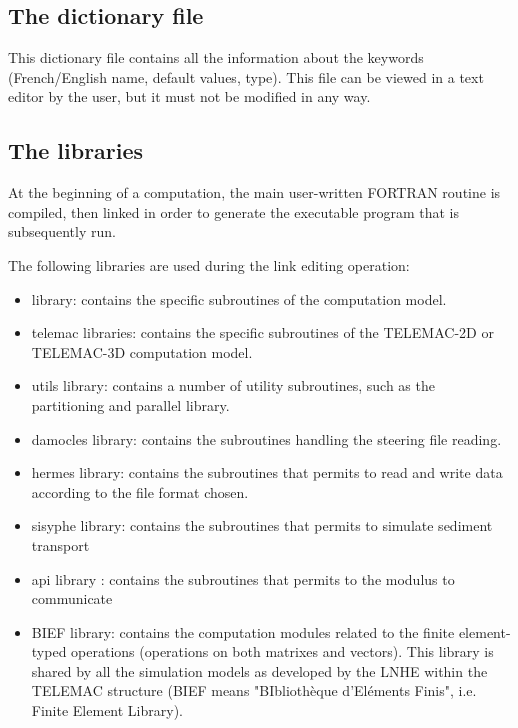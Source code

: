 \subsection{ The dictionary file}

 This dictionary file contains all the information about the keywords (French/English name, default values, type). This file can be viewed in a text editor by the user, but it must not be modified in any way.


\subsection{ The libraries}

 At the beginning of a computation, the main user-written FORTRAN routine is compiled, then linked in order to generate the executable program that is subsequently run.

 The following libraries are used during the link editing operation:

\begin{itemize}
\item  \tomawac library: contains the specific subroutines of the \tomawac computation model.

\item  telemac libraries: contains the specific subroutines of the TELEMAC-2D or TELEMAC-3D computation model.

\item  utils library: contains a number of utility subroutines, such as the partitioning and parallel library.

\item  damocles library: contains the subroutines handling the steering file reading.

\item  hermes library: contains the subroutines that permits to read and write data according to the file format chosen.

\item  sisyphe library: contains the subroutines that permits to simulate sediment transport

\item  api library : contains the subroutines that permits to the modulus to communicate

\item  BIEF library: contains the computation modules related to the finite element-typed operations (operations on both matrixes and vectors). This library is shared by all the simulation models as developed by the LNHE within the TELEMAC structure (BIEF means "BIbliothèque d'Eléments Finis", i.e. Finite Element Library).
\end{itemize}


